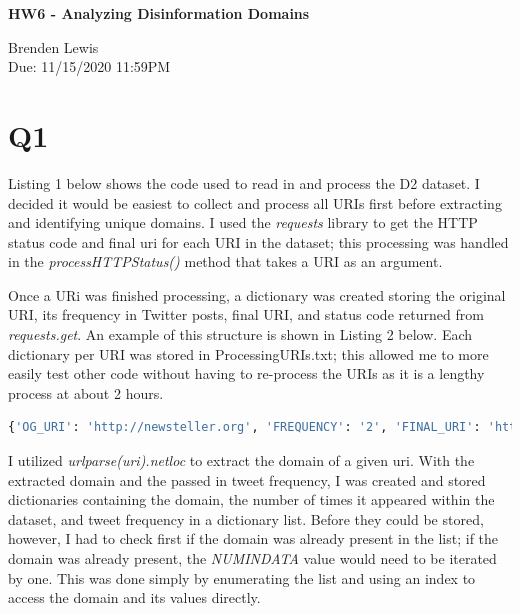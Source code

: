 \documentclass[12pt]{article}
\begin{document}
\begin{centering}
{\large\textbf{HW6 - Analyzing Disinformation Domains}}

Brenden Lewis\\                     
Due: 11/15/2020 11:59PM\\                      
\end{centering}

\section*{Q1}

Listing 1 below shows the code used to read in and process the D2 dataset. I decided it would be easiest to collect and process all URIs first before extracting and identifying unique domains. I used the \emph{requests} library to get the HTTP status code and final uri for each URI in the dataset; this processing was handled in the \emph{processHTTPStatus()} method that takes a URI as an argument.



Once a URi was finished processing, a dictionary was created storing the original URI, its frequency in Twitter posts, final URI, and status code returned from \emph{requests.get}. An example of this structure is shown in Listing 2 below. Each dictionary per URI was stored in ProcessingURIs.txt; this allowed me to more easily test other code without having to re-process the URIs as it is a lengthy process at about 2 hours.

\begin{lstlisting}[language=Python, caption={Entry from ProcessedURIs.txt}, label=lst:copy]
{'OG_URI': 'http://newsteller.org', 'FREQUENCY': '2', 'FINAL_URI': 'http://newsteller.org/', 'STATUS': 200}
\end{lstlisting}

I utilized \emph{urlparse(uri).netloc} to extract the domain of a given uri. With the extracted domain and the passed in tweet frequency, I was created and stored dictionaries containing the domain, the number of times it appeared within the dataset, and tweet frequency in a dictionary list. Before they could be stored, however, I had to check first if the domain was already present in the list; if the domain was already present, the \emph{NUM\textunderscore IN\textunderscore DATA} value would need to be iterated by one. This was done simply by enumerating the list and using an index to access the domain and its values directly.
\end{document}
